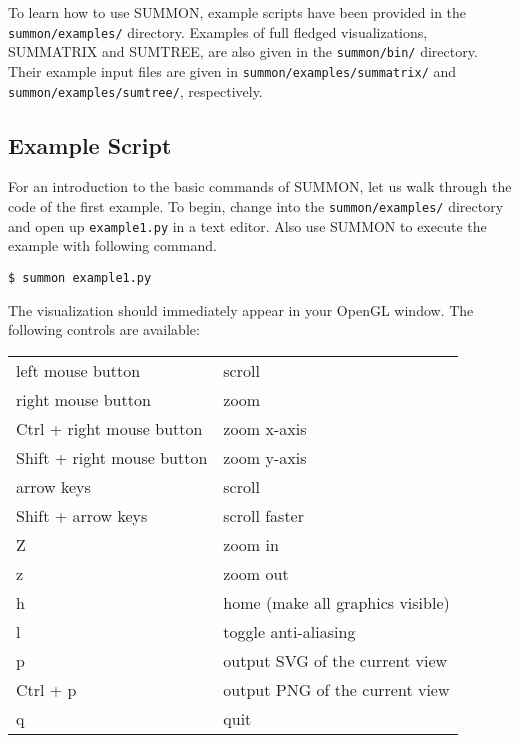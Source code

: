 \documentclass[12pt]{article}
\newcommand{\code}[1]{{\tt #1}}
\newcommand{\codeblock}[1]{\vspace{.1in} {\tt #1} \vspace{.1in}}
\begin{document}
To learn how to use SUMMON, example scripts have been provided in the 
\code{summon/examples/} directory.  Examples of full fledged
visualizations, SUMMATRIX and SUMTREE, are also given in the \code{summon/bin/}
directory.  Their example input files are given in
\code{summon/examples/summatrix/} and \code{summon/examples/sumtree/},
respectively.



\subsection{Example Script}

For an introduction to the basic commands of SUMMON, let us walk through the
code of the first example.  To begin, change into the
\code{summon/examples/} directory and open up \code{example1.py} in a
text editor.  Also use SUMMON to execute the example with following command.

\codeblock{\$ summon example1.py}

The visualization should immediately appear in your OpenGL window.  The
following controls are available:

\vspace{.1in}
\begin{tabular}{ll}
    left mouse button          & scroll \\
    right mouse button         & zoom \\
    Ctrl + right mouse button  & zoom x-axis \\
    Shift + right mouse button & zoom y-axis \\
    arrow keys                 & scroll \\
    Shift + arrow keys         & scroll faster \\
    Z                          & zoom in \\
    z                          & zoom out \\
    h                          & home (make all graphics visible) \\
    l                          & toggle anti-aliasing \\
    p                          & output SVG of the current view \\
    Ctrl + p                   & output PNG of the current view \\
    q                          & quit \\
\end{tabular}
\vspace{.2in}
\end{document}

